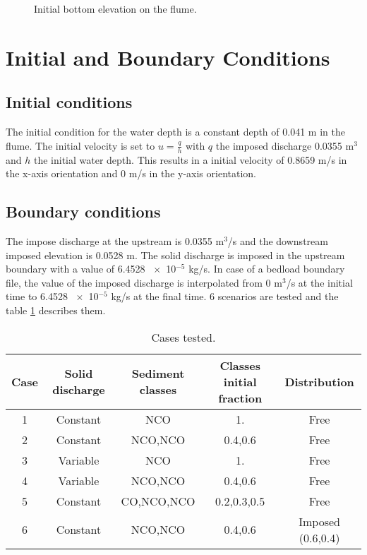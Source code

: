 \begin{figure}[H]
 \centering
 \caption{Initial bottom elevation on the flume.}
 \label{flumebc:bottom}
\end{figure}
%
\section{Initial and Boundary Conditions}

\subsection{Initial conditions}
%
The initial condition for the water depth is a constant depth of 0.041 m in the
 flume. The initial velocity is set to $u=\frac{q}{h}$ with $q$ the imposed
discharge 0.0355 m$^3$ and $h$ the initial water depth. This results in a
initial velocity of 0.8659 m/s in the x-axis orientation and 0 m/s in the y-axis
 orientation.
%
\subsection{Boundary conditions}
%
The impose discharge at the upstream is 0.0355 m$^3$/s and the downstream
imposed elevation is 0.0528 m.
%
The solid discharge is imposed in the upstream boundary with a value of 6.4528~
$\times$~10$^{-5}$ kg/s. In case of a bedload boundary file, the value of the
imposed discharge is interpolated from 0 m$^3$/s at the initial time to 6.4528~
$\times$~10$^{-5}$ kg/s at the final time.
%
6 scenarios are tested and the table \ref{flumebc:scenarii} describes them.
%
\begin{table}[h]
\centering
\begin{tabular}{|*{5}{c|}}
\hline
Case & Solid discharge & Sediment classes & Classes initial fraction &
Distribution \\
\hline
1 & Constant & NCO & 1. & Free \\
\hline
2 & Constant & NCO,NCO & 0.4,0.6 & Free \\
\hline
3 & Variable & NCO & 1. & Free \\
\hline
4 & Variable & NCO,NCO & 0.4,0.6 & Free \\
\hline
5 & Constant & CO,NCO,NCO & 0.2,0.3,0.5 & Free \\
\hline
6 & Constant & NCO,NCO & 0.4,0.6 & Imposed (0.6,0.4)\\
\hline
\end{tabular}
\caption{Cases tested.}
\label{flumebc:scenarii}
\end{table}
%
